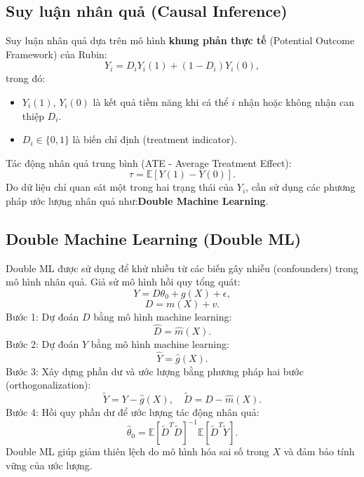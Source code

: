\subsection{Suy luận nhân quả (Causal Inference)}
Suy luận nhân quả dựa trên mô hình \textbf{khung phản thực tế} (Potential Outcome Framework) của Rubin:
\begin{equation}
    Y_i = D_i Y_i(1) + (1 - D_i) Y_i(0),
\end{equation}
trong đó:
\begin{itemize}
    \item $Y_i(1)$, $Y_i(0)$ là kết quả tiềm năng khi cá thể $i$ nhận hoặc không nhận can thiệp $D_i$.
    \item $D_i \in \{0,1\}$ là biến chỉ định (treatment indicator).
\end{itemize}
Tác động nhân quả trung bình (ATE - Average Treatment Effect):
\begin{equation}
    \tau = \mathbb{E}[Y(1) - Y(0)].
\end{equation}
Do dữ liệu chỉ quan sát một trong hai trạng thái của $Y_i$, cần sử dụng các phương pháp ước lượng nhân quả như:\textbf{Double Machine Learning}.

\subsection{Double Machine Learning (Double ML)}
Double ML được sử dụng để khử nhiễu từ các biến gây nhiễu (confounders) trong mô hình nhân quả. Giả sử mô hình hồi quy tổng quát:
\begin{equation}
    Y = D \theta_0 + g(X) + \epsilon,
\end{equation}
\begin{equation}
    D = m(X) + v.
\end{equation}
Bước 1: Dự đoán $D$ bằng mô hình machine learning:
\begin{equation}
    \hat{D} = \hat{m}(X).
\end{equation}
Bước 2: Dự đoán $Y$ bằng mô hình machine learning:
\begin{equation}
    \hat{Y} = \hat{g}(X).
\end{equation}
Bước 3: Xây dựng phần dư và ước lượng bằng phương pháp hai bước (orthogonalization):
\begin{equation}
    \tilde{Y} = Y - \hat{g}(X), \quad \tilde{D} = D - \hat{m}(X).
\end{equation}
Bước 4: Hồi quy phần dư để ước lượng tác động nhân quả:
\begin{equation}
    \hat{\theta}_0 = \mathbb{E}[\tilde{D}^T \tilde{D}]^{-1} \mathbb{E}[\tilde{D}^T \tilde{Y}].
\end{equation}
Double ML giúp giảm thiên lệch do mô hình hóa sai số trong $X$ và đảm bảo tính vững của ước lượng.

